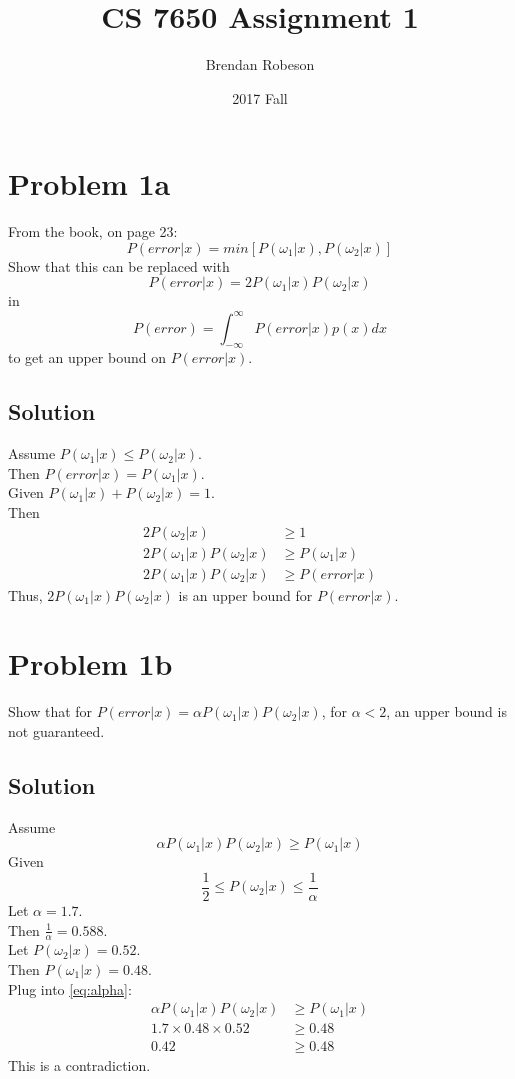 \documentclass{IEEEtran}
\title{CS 7650 Assignment 1}
\author{Brendan Robeson}
\date{2017 Fall}
\begin{document}
\maketitle

\section{Problem 1a}
From the book, on page 23:
\[ P(error|x) = min[P(\omega_1|x),P(\omega_2|x)] \]
Show that this can be replaced with
\[ P(error|x) = 2P(\omega_1|x)P(\omega_2|x) \]
in
\[ P(error) = \int_{-\infty}^\infty P(error|x)p(x)dx \]
to get an upper bound on \(P(error|x)\).
\subsection{Solution}
Assume \( P(\omega_1|x) \le P(\omega_2|x) \). \\
Then \( P(error|x) = P(\omega_1|x) \). \\
Given \( P(\omega_1|x) + P(\omega_2|x) = 1 \). \\
Then
\begin{align*}
    2P(\omega_2|x) &\ge 1 \\
    2P(\omega_1|x)P(\omega_2|x) &\ge P(\omega_1|x) \\
    2P(\omega_1|x)P(\omega_2|x) & \ge P(error|x)
\end{align*}
Thus, \(2P(\omega_1|x)P(\omega_2|x)\) is an upper bound for \(P(error|x)\).

\newpage

\section{Problem 1b}
Show that for \(P(error|x) = \alpha P(\omega_1|x)P(\omega_2|x)\), for \(\alpha < 2\), an upper bound
is not guaranteed.
\subsection{Solution}
Assume
\begin{equation}\label{eq:alpha}
    \alpha P(\omega_1|x)P(\omega_2|x) \ge P(\omega_1|x)
\end{equation}
Given
\begin{equation}
    \frac{1}{2} \le P(\omega_2|x) \le \frac{1}{\alpha}
\end{equation}
Let \(\alpha = 1.7\). \\
Then \(\frac{1}{\alpha} = 0.588\). \\
Let \(P(\omega_2|x) = 0.52\). \\
Then \(P(\omega_1|x) = 0.48\). \\
Plug into \ref{eq:alpha}:
\begin{align*}
    \alpha P(\omega_1|x)P(\omega_2|x) &\ge P(\omega_1|x) \\
    1.7 \times 0.48 \times 0.52 &\ge 0.48 \\
    0.42 &\ge 0.48
\end{align*}
This is a contradiction.
\end{document}
